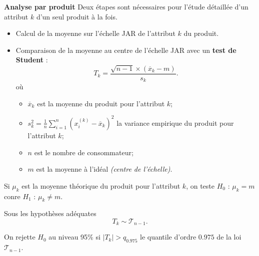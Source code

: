 \documentclass[aspectratio=169,xcolor=dvipsnames]{beamer}
\begin{document}
\begin{frame}
	\begin{block}{\textbf{Analyse par produit}}
	Deux étapes sont nécessaires pour l'étude détaillée d'un attribut $k$ d'un seul produit à la fois.
		\begin{itemize}
		\item Calcul de la moyenne sur l'échelle JAR de l'attribut $k$ du produit.
		\item Comparaison de la moyenne au centre de l'échelle JAR avec un \textbf{test de Student} :
			\[
			T_k = \dfrac{\sqrt{n-1}\times(\overline{x}_k-m)}{s_k}.
			\]
		où
			\begin{itemize}
			\item $\overline{x}_k$ est la moyenne du produit pour l'attribut $k$;
			\item $s_k^2 = \frac{1}{n} \sum_{i=1}^n (x_i^{(k)} -\overline{x}_k)^2$ la variance empirique du produit pour l'attribut $k$;
			\item $n$ est le nombre de consommateur;
			\item $m$ est la moyenne à l'idéal \emph{(centre de l'échelle)}.
			\end{itemize}
		\end{itemize}
	\end{block}
\end{frame}

\begin{frame}

\vfill

\textcolor{nyubluedarker}{\faCogs} Si $\mu_k$ est la moyenne théorique du produit pour l'attribut $k$, on teste $H_0$ : $\mu_k = m$ conre $H_1$ : $\mu_k \neq m$.

\medskip

\textcolor{nyubluedarker}{\faCogs} Sous les hypothèses adéquates
	\[
	T_k \sim \mathcal{T}_{n-1}.
	\]

\medskip

\textcolor{nyubluedarker}{\faCogs} On rejette $H_0$ au niveau 95\% si $ \left| T_k \right| > q_{0.975}$ le quantile d'ordre $0.975$ de la loi $\mathcal{T}_{n-1}$.

\vfill

\end{frame}
\end{document}
